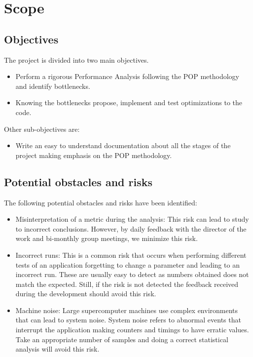 \section{Scope}

\subsection{Objectives}

The project is divided into two main objectives.
\begin{itemize}
  \item Perform a rigorous Performance Analysis following the POP methodology and identify bottlenecks.
  \item Knowing the bottlenecks propose, implement and test optimizations to the code.
\end{itemize}

Other sub-objectives are:
\begin{itemize}
  \item Write an easy to understand documentation about all the stages of the project making emphasis on the POP methodology.
\end{itemize}

\subsection{Potential obstacles and risks}

The following potential obstacles and risks have been identified:
\begin{itemize}
  \item Misinterpretation of a metric during the analysis: This risk can lead to study to incorrect conclusions. However, by daily feedback with the director of the work and bi-monthly group meetings, we minimize this risk.

  \item Incorrect runs: This is a common risk that occurs when performing different tests of an application forgetting to change a parameter and leading to an incorrect run. These are usually easy to detect as numbers obtained does not match the expected. Still, if the risk is not detected the feedback received during the development should avoid this risk.

  \item Machine noise: Large supercomputer machines use complex environments that can lead to system noise. System noise refers to abnormal events that interrupt the application making counters and timings to have erratic values. Take an appropriate number of samples and doing a correct statistical analysis will avoid this risk.
\end{itemize}

\clearpage
